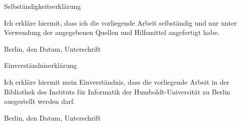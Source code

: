 
\pagebreak

{\sc Selbständigkeitserklärung}

Ich erkläre hiermit, dass ich die vorliegende Arbeit selbständig und
nur unter Verwendung der angegebenen Quellen und Hilfsmittel
angefertigt habe.

Berlin, den Datum, Unterschrift

Einverständniserklärung

Ich erkläre hiermit mein Einverständnis, dass die vorliegende Arbeit
in der Bibliothek des Instituts für Informatik der
Humboldt-Universität zu Berlin ausgestellt werden darf.

Berlin, den Datum, Unterschrift

\clearpage

